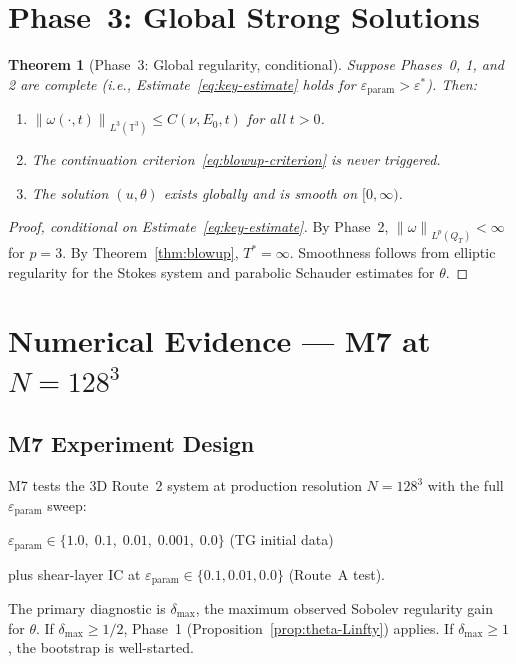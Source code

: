 \documentclass[11pt]{article}
\newtheorem{theorem}{Theorem}[section]
\theoremstyle{definition}
\theoremstyle{remark}
\newcommand{\T}{\mathbb{T}}
\newcommand{\norm}[1]{\left\|#1\right\|}
\newcommand{\epsst}{\varepsilon^*}
\newcommand{\epsp}{\varepsilon_{\mathrm{param}}}
\begin{document}
\section{Phase~3: Global Strong Solutions}
\label{sec:phase3}

\begin{theorem}[Phase~3: Global regularity, conditional]\label{thm:phase3}
  Suppose Phases~0, 1, and 2 are complete (i.e., Estimate~\eqref{eq:key-estimate}
  holds for $\epsp>\epsst$).  Then:
  \begin{enumerate}[label=(\roman*)]
  \item $\norm{\omega(\cdot,t)}_{L^3(\T^3)}\leq C(\nu,E_0,t)$ for all $t>0$.
  \item The continuation criterion~\eqref{eq:blowup-criterion} is never triggered.
  \item The solution $(u,\theta)$ exists globally and is smooth on $[0,\infty)$.
  \end{enumerate}
\end{theorem}

\begin{proof}[Proof, conditional on Estimate~\eqref{eq:key-estimate}]
  By Phase~2, $\norm{\omega}_{L^p(Q_T)}<\infty$ for $p=3$.  By
  Theorem~\ref{thm:blowup}, $T^*=\infty$.  Smoothness follows from
  elliptic regularity for the Stokes system and parabolic Schauder estimates
  for $\theta$.
\end{proof}

\section{Numerical Evidence — M7 at $N=128^3$}
\label{sec:numerics}

\subsection{M7 Experiment Design}

M7 tests the 3D Route~2 system at production resolution $N=128^3$ with
the full $\epsp$ sweep:
\begin{center}
$\epsp \in \{1.0,\; 0.1,\; 0.01,\; 0.001,\; 0.0\}$
\quad (TG initial data)
\end{center}
plus shear-layer IC at $\epsp\in\{0.1, 0.01, 0.0\}$ (Route~A test).

The primary diagnostic is $\delta_{\max}$, the maximum observed Sobolev
regularity gain for $\theta$.  If $\delta_{\max}\geq 1/2$, Phase~1
(Proposition~\ref{prop:theta-Linfty}) applies.  If $\delta_{\max}\geq 1$,
the bootstrap is well-started.
\end{document}
